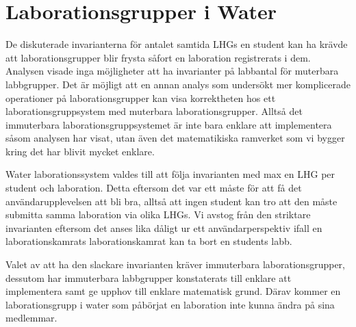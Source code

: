\section{Laborationsgrupper i Water}
De diskuterade invarianterna för antalet samtida LHGs en student kan ha
krävde att laborationsgrupper blir frysta såfort en laboration
registrerats i dem. Analysen visade inga möjligheter att ha invarianter
på labbantal för muterbara labbgrupper. Det är möjligt att en annan
analys som undersökt mer komplicerade operationer på laborationsgrupper
kan visa korrektheten hos ett laborationsgruppsystem med muterbara
laborationsgrupper. Alltså det immuterbara laborationsgruppsystemet är
inte bara enklare att implementera såsom analysen har visat, utan även
det matematikiska ramverket som vi bygger kring det har blivit mycket
enklare.

Water laborationssystem valdes till att följa invarianten med max en LHG
per student och laboration. Detta eftersom det var ett måste för att få
det användarupplevelsen att bli bra, alltså att ingen student
kan tro att den måste submitta samma laboration via olika LHGs. 
Vi avstog från den striktare invarianten eftersom det anses lika dåligt
ur ett användarperspektiv ifall en laborationskamrats laborationskamrat
kan ta bort en students labb.

Valet av att ha den slackare invarianten kräver immuterbara
laborationsgrupper, dessutom har immuterbara labbgrupper konstaterats
till enklare att implementera samt ge upphov till enklare matematisk
grund. Därav kommer en laborationsgrupp i water som påbörjat en
laboration inte kunna ändra på sina medlemmar.
